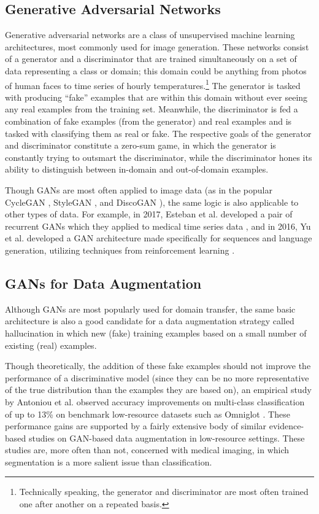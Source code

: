 \documentclass{article}
\begin{document}
    \subsection{Generative Adversarial Networks}
      Generative adversarial networks are a class of unsupervised machine learning architectures, most commonly used for image generation. These networks consist of a generator and a discriminator that are trained simultaneously on a set of data representing a class or domain; this domain could be anything from photos of human faces to time series of hourly temperatures.\footnote{Technically speaking, the generator and discriminator are most often trained one after another on a repeated basis.} The generator is tasked with producing ``fake'' examples that are within this domain without ever seeing any real examples from the training set. Meanwhile, the discriminator is fed a combination of fake examples (from the generator) and real examples and is tasked with classifying them as real or fake. The respective goals of the generator and discriminator constitute a zero-sum game, in which the generator is constantly trying to outsmart the discriminator, while the discriminator hones its ability to distinguish between in-domain and out-of-domain examples.

      Though GANs are most often applied to image data (as in the popular CycleGAN \cite{cyclegan}, StyleGAN \cite{stylegan}, and DiscoGAN \cite{discogan}), the same logic is also applicable to other types of data. For example, in 2017, Esteban et al. developed a pair of recurrent GANs which they applied to medical time series data \cite{rcgan}, and in 2016, Yu et al. developed a GAN architecture made specifically for sequences and language generation, utilizing techniques from reinforcement learning \cite{seqgan}.

    \subsection{GANs for Data Augmentation}
      Although GANs are most popularly used for domain transfer, the same basic architecture is also a good candidate for a data augmentation strategy called hallucination in which new (fake) training examples based on a small number of existing (real) examples.

      Though theoretically, the addition of these fake examples should not improve the performance of a discriminative model (since they can be no more representative of the true distribution than the examples they are based on), an empirical study by Antoniou et al. observed accuracy improvements on multi-class classification of up to 13\% on benchmark low-resource datasets such as Omniglot \cite{antoniou}. These performance gains are supported by a fairly extensive body of similar evidence-based studies on GAN-based data augmentation in low-resource settings. These studies are, more often than not, concerned with medical imaging, in which segmentation is a more salient issue than classification.
\end{document}

